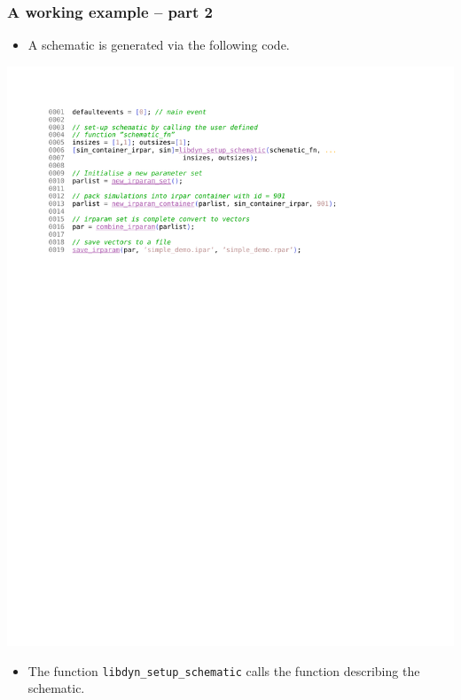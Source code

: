 \documentclass[serif,9pt,xcolor=dvipsnames]{beamer}
\begin{document}
\begin{frame}[fragile]
  \frametitle{A working example -- part 2}

\begin{itemize}
 \item A schematic is generated via the following code. 
\end{itemize}


\centering \includegraphics[trim=3cm 19cm 4cm 1.4cm, clip, width=0.85\linewidth]{figures/schematic_fn_load.pdf} 

\begin{itemize}
 \item The function \texttt{libdyn\_setup\_schematic} calls the function describing the schematic.
\end{itemize}


% 
% 
% 
% 
% 

\end{frame}
\end{document}
